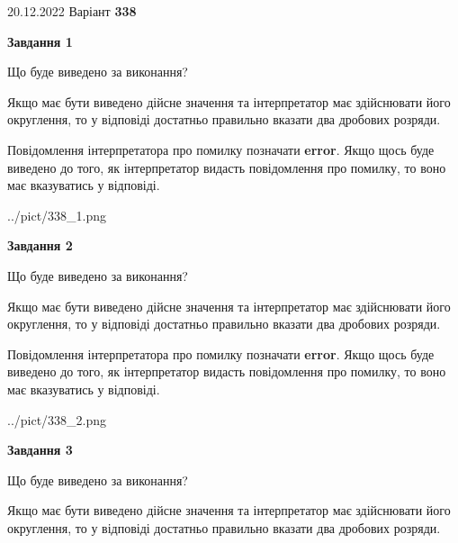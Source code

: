 \documentclass[12pt, ukrainian]{article}
\begin{document}
{20.12.2022 Варіант \No \textbf { 338 }\par}
{
\begin {Large}

{\begin {center}\textbf{Завдання 1}\end {center}}\par
Що буде виведено за виконання? \par

Якщо має бути виведено дійсне значення та інтерпретатор має здійснювати його округлення, 
то у відповіді достатньо правильно вказати два дробових розряди.

Повідомлення інтерпретатора про помилку позначати \textbf{error}.
Якщо щось буде виведено до того, як інтерпретатор видасть повідомлення про помилку, 
то воно має вказуватись у відповіді. \par

\begin{center}
	{../pict/338_1.png}
\end{center}
\newpage

{\begin {center}\textbf{Завдання 2}\end {center}}\par
Що буде виведено за виконання? \par

Якщо має бути виведено дійсне значення та інтерпретатор має здійснювати його округлення, 
то у відповіді достатньо правильно вказати два дробових розряди.

Повідомлення інтерпретатора про помилку позначати \textbf{error}.
Якщо щось буде виведено до того, як інтерпретатор видасть повідомлення про помилку, 
то воно має вказуватись у відповіді. \par

\begin{center}
	{../pict/338_2.png}
\end{center}
\newpage

{\begin {center}\textbf{Завдання 3}\end {center}}\par
Що буде виведено за виконання? \par

Якщо має бути виведено дійсне значення та інтерпретатор має здійснювати його округлення, 
то у відповіді достатньо правильно вказати два дробових розряди.


\end{Large}}
\end{document}
